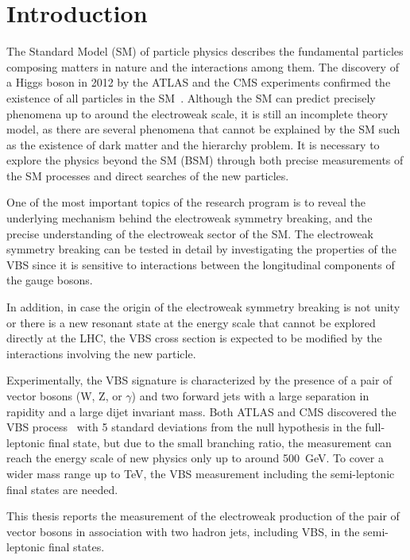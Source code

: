 \chapter{Introduction}
\label{chap:introduction}

The Standard Model (SM) of particle physics describes the fundamental particles composing matters in nature and the interactions among them. 
The discovery of a Higgs boson in 2012 by the ATLAS and the CMS experiments confirmed the existence of all particles in the SM~\cite{HIGG-2012-27,CMS-HIG-12-028}. 
Although the SM can predict precisely phenomena up to around the electroweak scale, it is still an incomplete theory model, as there are several phenomena that cannot be explained by the SM such as the existence of dark matter and the hierarchy problem. 
It is necessary to explore the physics beyond the SM (BSM) through both precise measurements of the SM processes and direct searches of the new particles.

One of the most important topics of the research program is to reveal the underlying mechanism behind the electroweak symmetry breaking, and the precise understanding of the electroweak sector of the SM. 
The electroweak symmetry breaking can be tested in detail by investigating the properties of the VBS since it is sensitive to interactions between the longitudinal components of the gauge bosons.

%
In addition, in case the origin of the electroweak symmetry breaking is not unity or there is a new resonant state at the energy scale that cannot be explored directly at the LHC, the VBS cross section is expected to be modified by the interactions involving the new particle.

Experimentally, the VBS signature is characterized by the presence of a pair of vector bosons (W, Z, or $\gamma$) and two forward jets with a large separation in rapidity and a large dijet invariant mass.
Both ATLAS and CMS discovered the VBS process~\cite{STDM-2017-19,CMS-SMP-20-001}
with 5 standard deviations from the null hypothesis in the full-leptonic final state, but due to the small branching ratio, the measurement can reach the energy scale of new physics only up to around 500~GeV.
To cover a wider mass range up to TeV, the VBS measurement including the semi-leptonic final states are needed.

%
This thesis reports the measurement of the electroweak production of the pair of vector bosons in association with two hadron jets, including VBS, in the semi-leptonic final states.

